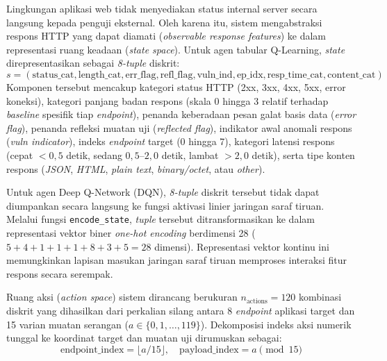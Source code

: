 Lingkungan aplikasi web tidak menyediakan status internal server secara langsung kepada penguji eksternal. Oleh karena itu, sistem mengabstraksi respons HTTP yang dapat diamati (\textit{observable response features}) ke dalam representasi ruang keadaan (\textit{state space}). Untuk agen tabular Q-Learning, \textit{state} direpresentasikan sebagai \textit{8-tuple} diskrit:
\begin{equation}
s = (\text{status\_cat}, \text{length\_cat}, \text{err\_flag}, \text{refl\_flag}, \text{vuln\_ind}, \text{ep\_idx}, \text{resp\_time\_cat}, \text{content\_cat})
\end{equation}
Komponen tersebut mencakup kategori status HTTP (2xx, 3xx, 4xx, 5xx, error koneksi), kategori panjang badan respons (skala 0 hingga 3 relatif terhadap \textit{baseline} spesifik tiap \textit{endpoint}), penanda keberadaan pesan galat basis data (\textit{error flag}), penanda refleksi muatan uji (\textit{reflected flag}), indikator awal anomali respons (\textit{vuln indicator}), indeks \textit{endpoint} target (0 hingga 7), kategori latensi respons (cepat $<0,5$ detik, sedang $0,5\text{--}2,0$ detik, lambat $>2,0$ detik), serta tipe konten respons (\textit{JSON}, \textit{HTML}, \textit{plain text}, \textit{binary/octet}, atau \textit{other}).

Untuk agen Deep Q-Network (DQN), \textit{8-tuple} diskrit tersebut tidak dapat diumpankan secara langsung ke fungsi aktivasi linier jaringan saraf tiruan. Melalui fungsi \texttt{encode\_state}, \textit{tuple} tersebut ditransformasikan ke dalam representasi vektor biner \textit{one-hot encoding} berdimensi 28 ($5 + 4 + 1 + 1 + 1 + 8 + 3 + 5 = 28$ dimensi). Representasi vektor kontinu ini memungkinkan lapisan masukan jaringan saraf tiruan memproses interaksi fitur respons secara serempak.

Ruang aksi (\textit{action space}) sistem dirancang berukuran $n_{\text{actions}} = 120$ kombinasi diskrit yang dihasilkan dari perkalian silang antara 8 \textit{endpoint} aplikasi target dan 15 varian muatan serangan ($a \in \{0, 1, \dots, 119\}$). Dekomposisi indeks aksi numerik tunggal ke koordinat target dan muatan uji dirumuskan sebagai:
\begin{equation}
\text{endpoint\_index} = \lfloor a / 15 \rfloor, \quad \text{payload\_index} = a \pmod{15}
\end{equation}

